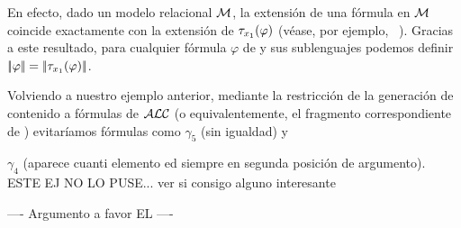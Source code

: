 En efecto, dado un modelo relacional $\mathcal{M}$, la extensi\'on de una f\'ormula \ALC en $\mathcal{M}$ coincide exactamente con la extensi\'on
 de $\mathit{\tau}_{x_1}(\varphi)$ (v\'ease, por ejemplo, ~\cite{baad:desc03}). Gracias
a este resultado, para cualquier f\'ormula $\varphi$ de \ALC y sus sublenguajes podemos definir 
$|\!|\varphi|\!| = |\!|\mathit{\tau}_{x_1}(\varphi)|\!|$.




 Volviendo a nuestro ejemplo anterior, mediante la restricci\'on de la generaci\'on de contenido
a f\'ormulas de $\mathcal{ALC}$ (o equivalentemente, el fragmento correspondiente de \FOL)
evitar\'iamos f\'ormulas como
$\gamma_5$ (sin igualdad) y

$\gamma_4$ (aparece cuanti elemento ed
siempre en segunda posici\'on de argumento). ESTE EJ NO LO PUSE... ver si consigo alguno interesante







----
Argumento a favor EL
----

